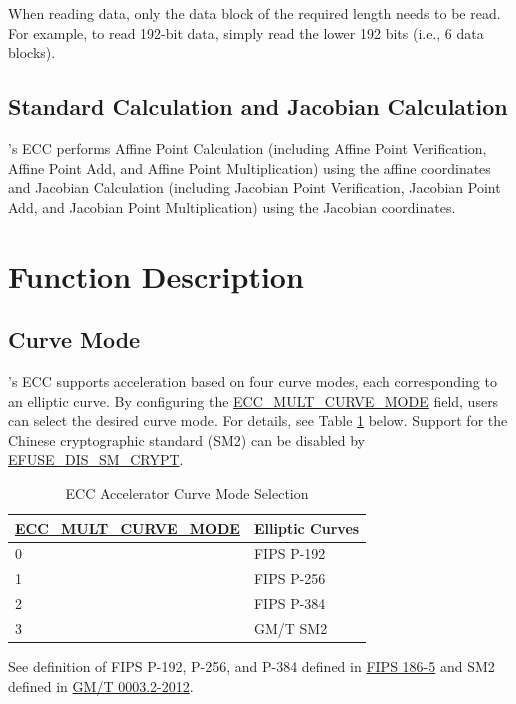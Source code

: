 \documentclass[main\_\_EN.tex]{subfiles}
\begin{document}
\begin{tiplisting}
When reading data, only the data block of the required length needs to be read. For example, to read 192-bit data, simply read the lower 192 bits (i.e., 6 data blocks).
\end{tiplisting}


\subsection{Standard Calculation and Jacobian Calculation}

\chipname{}'s ECC performs Affine Point Calculation (including Affine Point Verification, Affine Point Add, and Affine Point Multiplication) using the affine coordinates and Jacobian Calculation (including Jacobian Point Verification, Jacobian Point Add, and Jacobian Point Multiplication) using the Jacobian coordinates.

\section{Function Description}
\label{sec:ecc-mode-config}
\subsection{Curve Mode}

\chipname{}'s ECC supports acceleration based on four curve modes, each corresponding to an elliptic curve. By configuring the \hyperref[fielddesc:ECCMULTCURVEMODE]{ECC\_MULT\_CURVE\_MODE} field, users can select the desired curve mode. For details, see Table \ref{tab:ecc-curve-mode} below. Support for the Chinese cryptographic standard (SM2) can be disabled by \hyperref[fielddesc:EFUSEDISSMCRYPT]{EFUSE\_DIS\_SM\_CRYPT}.


\begin{table}[H]
    \centering
    \caption{ECC Accelerator Curve Mode Selection}
    \label{tab:ecc-curve-mode}
    \begin{threeparttable}
    \begin{tabular}{|p{4.2cm}|p{3.6cm}|}
    \hline
        \rowcolor{lightgray}
        \textbf{\hyperref[fielddesc:ECCMULTCURVEMODE]{ECC\_MULT\_CURVE\_MODE}} & \textbf{Elliptic Curves\tnote{*}} \\ \hline
        0 & FIPS P-192  \\\hline
        1 & FIPS P-256  \\\hline
        2 & FIPS P-384  \\\hline
        3 & GM/T SM2  \\\hline
    \end{tabular}
    \begin{tablenotes}
        \item[*] See definition of FIPS P-192, P-256, and P-384 defined in \href{https://nvlpubs.nist.gov/nistpubs/FIPS/NIST.FIPS.186-5.pdf}{FIPS 186-5} and SM2 defined in \href{http://www.gmbz.org.cn/file/2018-01-08/f60d13a3-e0fd-40d8-a80f-13fde691ef03.pdf}{GM/T 0003.2-2012}.
    \end{tablenotes}
    \end{threeparttable}
\end{table}
\end{document}
